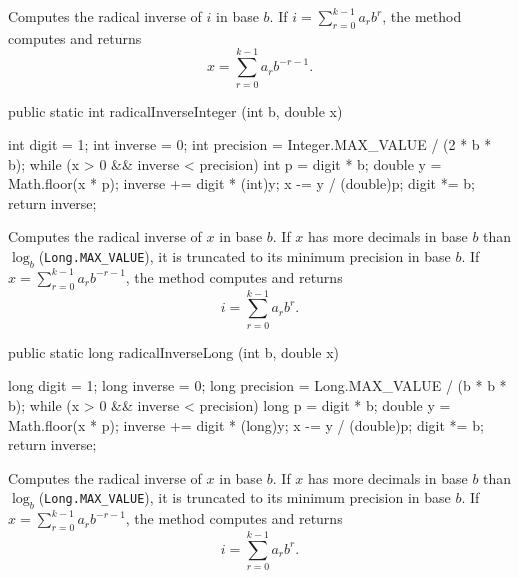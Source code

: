  \begin{tabb}
   Computes the radical inverse of $i$ in base $b$.
   If $i=\sum_{r=0}^{k-1} a_r b^r$, the method computes and returns
   \[
    x = \sum_{r=0}^{k-1} a_r b^{-r-1}.
   \]
 \end{tabb}
\begin{htmlonly}
\end{htmlonly}
\begin{code} 

   public static int radicalInverseInteger (int b, double x) \begin{hide} {
      int digit = 1;
      int inverse = 0;
      int precision = Integer.MAX_VALUE / (2 * b * b);
      while (x > 0 && inverse < precision) {
        int p = digit * b;
        double y = Math.floor(x * p);
        inverse += digit * (int)y;
        x -= y / (double)p;
        digit *= b;
      }
      return inverse;
   }\end{hide}
\end{code}
 \begin{tabb}
Computes the radical inverse of $x$ in base $b$.
If $x$ has more decimals in base $b$ than $\log_b$(\texttt{Long.MAX\_VALUE}),
it is truncated to its minimum precision in base $b$.
   If $x=\sum_{r=0}^{k-1} a_r b^{-r-1}$, the method computes and returns
   \[
    i = \sum_{r=0}^{k-1} a_r b^r.
   \]
 \end{tabb}
\begin{htmlonly}
\end{htmlonly}
\begin{code} 

   public static long radicalInverseLong (int b, double x) \begin{hide} {
      long digit = 1;
      long inverse = 0;
      long precision = Long.MAX_VALUE / (b * b * b);
      while (x > 0 && inverse < precision) {
        long p = digit * b;
        double y = Math.floor(x * p);
        inverse += digit * (long)y;
        x -= y / (double)p;
        digit *= b;
      }
      return inverse;
   }\end{hide}
\end{code}
 \begin{tabb}
   Computes the radical inverse of $x$ in base $b$.
If $x$ has more decimals in base $b$ than $\log_b$(\texttt{Long.MAX\_VALUE}),
it is truncated to its minimum precision in base $b$.
   If $x=\sum_{r=0}^{k-1} a_r b^{-r-1}$, the method computes and returns
   \[
    i = \sum_{r=0}^{k-1} a_r b^r.
   \]
 \end{tabb}
